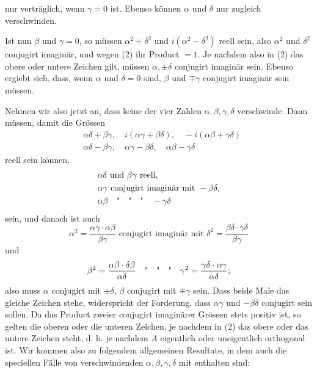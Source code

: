 nur verträglich, wenn $\gamma = 0$ ist. Ebenso können $\alpha$ und $\delta$ nur
zugleich verschwinden.

Ist nun $\beta$ und $\gamma = 0$, so müssen $\alpha^2 + \delta^2$ und $i(\alpha^2 - \delta^2)$
reell sein, also $\alpha^2$ und $\delta^2$ conjugirt imaginär, und wegen (2) ihr
Product $= 1$. Je nachdem also in (2) das obere oder untere
Zeichen gilt, müssen $\alpha, \pm\delta$ conjugirt imaginär sein. Ebenso ergiebt
 sich, dass, wenn $\alpha$ und $\delta = 0$ sind, $\beta$ und $\mp\gamma$ conjugirt
imaginär sein müssen.

Nehmen wir also jetzt an, dass keine der vier Zahlen $\alpha, \beta, \gamma, \delta$
verschwinde. Dann müssen, damit die Grössen
\[
\begin{aligned}
&\alpha\delta+\beta\gamma,\quad i(\alpha\gamma+\beta\delta),\quad -i(\alpha\beta+\gamma\delta)\\
&\alpha\delta-\beta\gamma,\quad \alpha\gamma-\beta\delta,\quad \alpha\beta-\gamma\delta
\end{aligned}
\]
reell sein können,
\[
\begin{aligned}
&\alpha\delta \text{ und } \beta\gamma \text{ reell,}\\
&\alpha\gamma \text{ conjugirt imaginär mit } -\beta\delta,\\
&\alpha\beta \quad \text{\textquotedbl{}}\quad \text{\textquotedbl{}}\quad \text{\textquotedbl{}}\quad -\gamma\delta
\end{aligned}
\]
sein, und danach ist auch
\[
\alpha^2 = \frac{\alpha\gamma \cdot \alpha\beta}{\beta\gamma} \text{ conjugirt imaginär mit } \delta^2 = \frac{\beta\delta \cdot \gamma\delta}{\beta\gamma}
\]
und
\[
\beta^2 = \frac{\alpha\beta \cdot \delta\beta}{\alpha\delta} \quad \text{\textquotedbl{}}\quad \text{\textquotedbl{}}\quad \text{\textquotedbl{}}\quad \gamma^2 = \frac{\gamma\delta \cdot \alpha\gamma}{\alpha\delta};
\]
also muss $\alpha$ conjugirt mit $\pm\delta$, $\beta$ conjugirt mit $\mp\gamma$ sein. Dass
beide Male das gleiche Zeichen stehe, widerspricht der Forderung,
dass $\alpha\gamma$ und $-\beta\delta$ conjugirt sein sollen. Da das Product
zweier conjugirt imaginärer Grössen stets positiv ist, so gelten
die oberen oder die unteren Zeichen, je nachdem in (2) das
obere oder das untere Zeichen steht, d. h. je nachdem $A$ eigentlich
 oder uneigentlich orthogonal ist. Wir kommen also zu
folgendem allgemeinen Resultate, in dem auch die speciellen
Fälle von verschwindenden $\alpha, \beta, \gamma, \delta$ mit enthalten sind:


